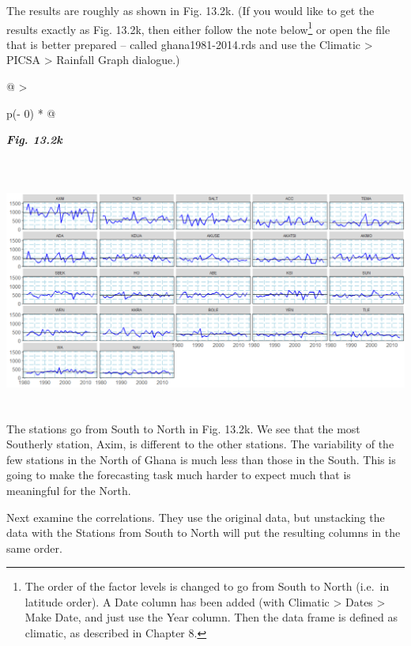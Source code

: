 \documentclass[
  letterpaper,
  DIV=11,
  numbers=noendperiod]{scrreprt}
\begin{document}
The results are roughly as shown in Fig. 13.2k. (If you would like to
get the results exactly as Fig. 13.2k, then either follow the note
below\footnote{The order of the factor levels is changed to go from
  South to North (i.e.~in latitude order). A Date column has been added
  (with Climatic \textgreater{} Dates \textgreater{} Make Date, and just
  use the Year column. Then the data frame is defined as climatic, as
  described in Chapter 8.} or open the file that is better prepared --
called ghana1981-2014.rds and use the Climatic \textgreater{} PICSA
\textgreater{} Rainfall Graph dialogue.)

\begin{longtable}[]{@{}
  >{\raggedright\arraybackslash}p{(\columnwidth - 0\tabcolsep) * }@{}}
\toprule\noalign{}
\begin{minipage}[b]{\linewidth}\raggedright
\textbf{\emph{Fig. 13.2k}}
\end{minipage} \\
\midrule\noalign{}
\endhead
\bottomrule\noalign{}
\endlastfoot
\includegraphics[width=6.26806in,height=3.05764in]{figures/Fig13.2k.png} \\
\end{longtable}

The stations go from South to North in Fig. 13.2k. We see that the most
Southerly station, Axim, is different to the other stations. The
variability of the few stations in the North of Ghana is much less than
those in the South. This is going to make the forecasting task much
harder to expect much that is meaningful for the North.

Next examine the correlations. They use the original data, but
unstacking the data with the Stations from South to North will put the
resulting columns in the same order.
\end{document}
